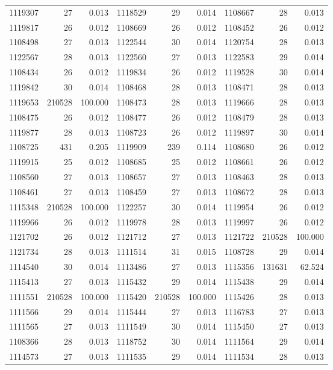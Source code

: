 \documentclass[11pt,a4paper]{article}
\begin{document}
\begin{longtable}{rrr|rrr|rrr}
1119307 & 27 & 0.013 & 1118529 & 29 & 0.014 & 1108667 & 28 & 0.013\\
1119817 & 26 & 0.012 & 1108669 & 26 & 0.012 & 1108452 & 26 & 0.012\\
1108498 & 27 & 0.013 & 1122544 & 30 & 0.014 & 1120754 & 28 & 0.013\\
1122567 & 28 & 0.013 & 1122560 & 27 & 0.013 & 1122583 & 29 & 0.014\\
1108434 & 26 & 0.012 & 1119834 & 26 & 0.012 & 1119528 & 30 & 0.014\\
1119842 & 30 & 0.014 & 1108468 & 28 & 0.013 & 1108471 & 28 & 0.013\\
1119653 & 210528 & 100.000 & 1108473 & 28 & 0.013 & 1119666 & 28 & 0.013\\
1108475 & 26 & 0.012 & 1108477 & 26 & 0.012 & 1108479 & 28 & 0.013\\
1119877 & 28 & 0.013 & 1108723 & 26 & 0.012 & 1119897 & 30 & 0.014\\
1108725 & 431 & 0.205 & 1119909 & 239 & 0.114 & 1108680 & 26 & 0.012\\
1119915 & 25 & 0.012 & 1108685 & 25 & 0.012 & 1108661 & 26 & 0.012\\
1108560 & 27 & 0.013 & 1108657 & 27 & 0.013 & 1108463 & 28 & 0.013\\
1108461 & 27 & 0.013 & 1108459 & 27 & 0.013 & 1108672 & 28 & 0.013\\
1115348 & 210528 & 100.000 & 1122257 & 30 & 0.014 & 1119954 & 26 & 0.012\\
1119966 & 26 & 0.012 & 1119978 & 28 & 0.013 & 1119997 & 26 & 0.012\\
1121702 & 26 & 0.012 & 1121712 & 27 & 0.013 & 1121722 & 210528 & 100.000\\
1121734 & 28 & 0.013 & 1111514 & 31 & 0.015 & 1108728 & 29 & 0.014\\
1114540 & 30 & 0.014 & 1113486 & 27 & 0.013 & 1115356 & 131631 & 62.524\\
1115413 & 27 & 0.013 & 1115432 & 29 & 0.014 & 1115438 & 29 & 0.014\\
1111551 & 210528 & 100.000 & 1115420 & 210528 & 100.000 & 1115426 & 28 & 0.013\\
1111566 & 29 & 0.014 & 1115444 & 27 & 0.013 & 1116783 & 27 & 0.013\\
1111565 & 27 & 0.013 & 1111549 & 30 & 0.014 & 1115450 & 27 & 0.013\\
1108366 & 28 & 0.013 & 1118752 & 30 & 0.014 & 1111564 & 29 & 0.014\\
1114573 & 27 & 0.013 & 1111535 & 29 & 0.014 & 1111534 & 28 & 0.013\\

\end{longtable}
\end{document}

